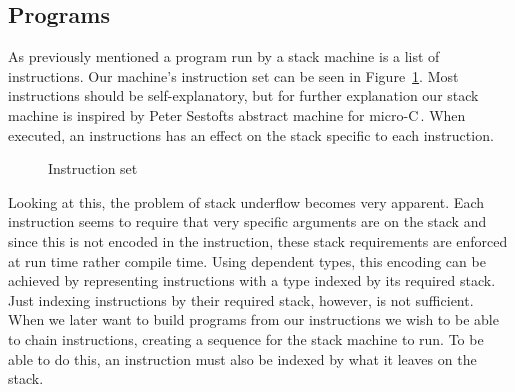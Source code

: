 \subsection{Programs}
\label{sec:program}
As previously mentioned a program run by a stack machine is a list of instructions. Our machine's instruction set can be seen in Figure~\ref{fig:inst_set}. Most instructions should be self-explanatory, but for further explanation our stack machine is inspired by Peter Sestofts abstract machine for micro-C\,\cite[pp. 157--161]{Sestoft:PLC}. When executed, an instructions has an effect on the stack specific to each instruction.

\begin{figure}
\caption{Instruction set}
\label{fig:inst_set}
\end{figure}

Looking at this, the problem of stack underflow becomes very apparent. Each instruction seems to require that very specific arguments are on the stack and since this is not encoded in the instruction, these stack requirements are enforced at run time rather compile time. Using dependent types, this encoding can be achieved by representing instructions with a type indexed by its required stack. Just indexing instructions by their required stack, however, is not sufficient. When we later want to build programs from our instructions we wish to be able to chain instructions, creating a sequence for the stack machine to run. To be able to do this, an instruction must also be indexed by what it leaves on the stack. 

